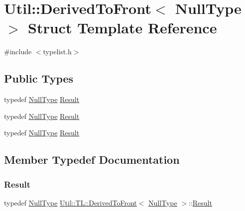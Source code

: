 \hypertarget{structUtil_1_1TL_1_1DerivedToFront_3_01NullType_01_4}{}\section{Util\+:\+:Derived\+To\+Front$<$ Null\+Type $>$ Struct Template Reference}
\label{structUtil_1_1TL_1_1DerivedToFront_3_01NullType_01_4}


{\ttfamily \#include $<$typelist.\+h$>$}

\subsection*{Public Types}
\begin{DoxyCompactItemize}
\item 
typedef \mbox{\hyperlink{classUtil_1_1NullType}{Null\+Type}} \mbox{\hyperlink{structUtil_1_1TL_1_1DerivedToFront_3_01NullType_01_4_aabbce675be682669b47f114d57de74eb}{Result}}
\item 
typedef \mbox{\hyperlink{classUtil_1_1NullType}{Null\+Type}} \mbox{\hyperlink{structUtil_1_1TL_1_1DerivedToFront_3_01NullType_01_4_aabbce675be682669b47f114d57de74eb}{Result}}
\item 
typedef \mbox{\hyperlink{classUtil_1_1NullType}{Null\+Type}} \mbox{\hyperlink{structUtil_1_1TL_1_1DerivedToFront_3_01NullType_01_4_aabbce675be682669b47f114d57de74eb}{Result}}
\end{DoxyCompactItemize}


\subsection{Member Typedef Documentation}
\mbox{\label{structUtil_1_1TL_1_1DerivedToFront_3_01NullType_01_4_aabbce675be682669b47f114d57de74eb}} 
\subsubsection{\texorpdfstring{Result}{Result}\hspace{0.1cm}{\footnotesize\ttfamily [1/3]}}
{\footnotesize\ttfamily typedef \mbox{\hyperlink{classUtil_1_1NullType}{Null\+Type}} \mbox{\hyperlink{structUtil_1_1TL_1_1DerivedToFront}{Util\+::\+T\+L\+::\+Derived\+To\+Front}}$<$ \mbox{\hyperlink{classUtil_1_1NullType}{Null\+Type}} $>$\+::\mbox{\hyperlink{structUtil_1_1TL_1_1DerivedToFront_3_01NullType_01_4_aabbce675be682669b47f114d57de74eb}{Result}}}

